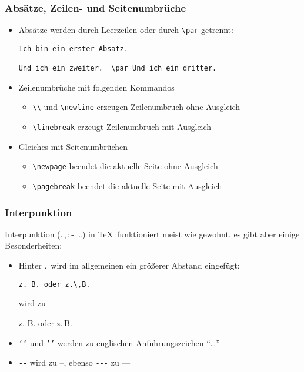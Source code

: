 \begin{frame}[fragile]
  \frametitle{Absätze, Zeilen- und Seitenumbrüche}

  \onslide<+->

  \begin{itemize}
  \item<+-> Absätze werden durch Leerzeilen oder durch \lstinline{\par} getrennt:

\begin{lstlisting}
Ich bin ein erster Absatz.

Und ich ein zweiter.  \par Und ich ein dritter.
\end{lstlisting}
  \item<+-> Zeilenumbrüche mit folgenden Kommandos
    \begin{itemize}
    \item<+-> \lstinline{\\} und \lstinline{\newline} erzeugen Zeilenumbruch ohne Ausgleich
    \item<+-> \lstinline{\linebreak} erzeugt Zeilenumbruch mit Ausgleich
    \end{itemize}
  \item<+-> Gleiches mit Seitenumbrüchen
    \begin{itemize}
    \item<+-> \lstinline{\newpage} beendet die aktuelle Seite ohne Ausgleich
    \item<+-> \lstinline{\pagebreak} beendet die aktuelle Seite mit Ausgleich
    \end{itemize}

  \end{itemize}

\end{frame}

\begin{frame}[fragile]
  \frametitle{Interpunktion}

  \onslide<+->

  Interpunktion (.\,,\,;\,- \dots) in \TeX\ funktioniert meist wie gewohnt, es gibt aber einige
  Besonderheiten:

  \begin{itemize}
  \item<+-> Hinter .\ wird im allgemeinen ein größerer Abstand eingefügt:
\begin{lstlisting}
z. B. oder z.\,B.
\end{lstlisting}
    wird zu
    \begin{center}
      z. B. oder z.\,B.
    \end{center}
  \item<+-> \texttt{`\kern0pt`} und \texttt{'\kern0pt'} werden zu englischen
    Anführungszeichen ``\dots''
  \item<+-> \texttt{-\kern0pt-} wird zu --, ebenso \texttt{-\kern0pt-\kern0pt-} zu ---
  \end{itemize}

\end{frame}


